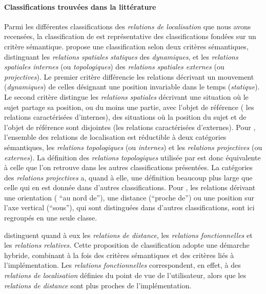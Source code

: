 \paragraph{Classifications trouvées dans la littérature}

Parmi les différentes classifications des \emph{relations de
  localisation} que nous avons recensées, la classification de
\textcite{Borillo1998} est représentative des classifications fondées
sur un critère sémantique. \textcite{Borillo1998} propose une
classification selon deux critères sémantiques, distinguant les
\emph{relations spatiales statiques} des \emph{dynamiques}, et les
\emph{relations spatiales internes} (ou \emph{topologiques}) des
\emph{relations spatiales externes} (ou \emph{projectives}). Le
premier critère différencie les relations décrivant un mouvement
(\emph{dynamiques}) de celles désignant une position invariable dans
le temps (\emph{statique}). Le second critère distingue les
\emph{relations spatiales} décrivant une situation où le sujet partage
sa position, ou du moins une partie, avec l'objet de référence (\ie
les relations caractérisées d'internes), des situations où la position
du sujet et de l'objet de référence sont disjointes (\ie les relations
caractérisées d'externes). Pour \textcite{Borillo1998}, l'ensemble des
relations de localisation est réductible à deux catégories
sémantiques, les \emph{relations topologiques} (ou \emph{internes}) et
les \emph{relations projectives} (ou \emph{externes}). La définition
des \emph{relations topologiques} utilisée par \textcite{Borillo1998}
est donc équivalente à celle que l'on retrouve dans les autres
classifications présentées. La catégories des \emph{relations
  projectives} a, quand à elle, une définition beaucoup plus large que
celle qui en est donnée dans d'autres classifications. Pour
\textcite{Borillo1998}, les relations dérivant une orientation (\eg
\enquote{au nord de}), une distance (\eg \enquote{proche de}) ou une
position sur l'axe vertical (\eg \enquote{sous}), qui sont distinguées
dans d'autres classifications, sont ici regroupés en une seule classe.

\textcite{Bateman2010} distinguent quand à eux les \emph{relations de
  distance}, les \emph{relations fonctionnelles} et les
\emph{relations relatives.} Cette proposition de classification adopte
une démarche hybride, combinant à la fois des critères sémantiques et
des critères liés à l'implémentation. Les \emph{relations
  fonctionnelles} correspondent, en effet, à des \emph{relations de
  localisation} définies du point de vue de l'utilisateur, alors que
les \emph{relations de distance} sont plus proches de
l'implémentation.


